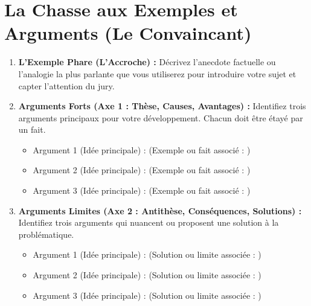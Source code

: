 \section{La Chasse aux Exemples et Arguments (Le Convaincant)}
\begin{enumerate}[label=\textbf{A.\arabic*}]
    \item \textbf{L'Exemple Phare (L'Accroche) :}
    \small Décrivez l'anecdote factuelle ou l'analogie la plus parlante que vous utiliserez pour introduire votre sujet et capter l'attention du jury.\\
    \normalsize
    \framebox[\linewidth]{\parbox{\linewidth}{\vspace{0.3cm}\dotfill \vspace{0.3cm} \dotfill \vspace{0.3cm}}}

    \item \textbf{Arguments Forts (Axe 1 : Thèse, Causes, Avantages) :}
    \small Identifiez trois arguments principaux pour votre développement. Chacun doit être étayé par un fait.
    \normalsize
    \begin{itemize}[label=--]
        \item Argument 1 (Idée principale) : \dotfill \quad \small (Exemple ou fait associé : \dotfill)
        \item Argument 2 (Idée principale) : \dotfill \quad \small (Exemple ou fait associé : \dotfill)
        \item Argument 3 (Idée principale) : \dotfill \quad \small (Exemple ou fait associé : \dotfill)
    \end{itemize}

    \item \textbf{Arguments Limites (Axe 2 : Antithèse, Conséquences, Solutions) :}
    \small Identifiez trois arguments qui nuancent ou proposent une solution à la problématique.
    \normalsize
    \begin{itemize}[label=--]
        \item Argument 1 (Idée principale) : \dotfill \quad \small (Solution ou limite associée : \dotfill)
        \item Argument 2 (Idée principale) : \dotfill \quad \small (Solution ou limite associée : \dotfill)
        \item Argument 3 (Idée principale) : \dotfill \quad \small (Solution ou limite associée : \dotfill)
    \end{itemize}
\end{enumerate}

